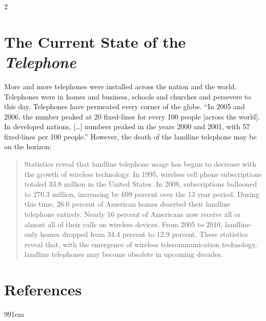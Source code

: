 \documentclass[12pt singlecol]{article}
\begin{document}
\begin{flushleft}
\begin{multicols}{2}
\section{The Current State of the \emph{Telephone}}

More and more telephones were installed across the nation and the world. Telephones were in homes and business, schools and churches and persevere to this day. Telephones have permeated every corner of the globe. ``In 2005 and 2006, the number peaked at 20 fixed-lines for every 100 people [across the world]. In developed nations, [\ldots] numbers peaked in the years 2000 and 2001, with 57 fixed-lines per 100 people.''\cite[para.~3]{Belh13} However, the death of the landline telephone may be on the horizon:

\begin{quotation}
Statistics reveal that landline telephone usage has begun to decrease with the growth of wireless technology. In 1995, wireless cell phone subscriptions totaled 33.8 million in the United States. In 2008, subscriptions ballooned to 270.3 million, increasing by 699 percent over the 13 year period. During this time, 26.6 percent of American homes deserted their landline telephone entirely. Nearly 16 percent of Americans now receive all or almost all of their calls on wireless devices. From 2005 to 2010, landline-only homes dropped from 34.4 percent to 12.9 percent. These statistics reveal that, with the emergence of wireless telecommunication technology, landline telephones may become obsolete in upcoming decades.\cite[para.~3]{Belh13}
\end{quotation}

\end{multicols}

\newpage %
\renewcommand*{\refname}{} %
\section{References}     %
\def\bibindent{1em}
\begin{thebibliography}{99\kern\bibindent}
\makeatletter
\let\old@biblabel\@biblabel
\def\@biblabel#1{\old@biblabel{#1}\kern\bibindent}
\let\old@bibitem\bibitem
\def\bibitem#1{\old@bibitem{#1}\leavevmode\kern-\bibindent}
\makeatother


\end{thebibliography}
\end{flushleft}
\end{document}
